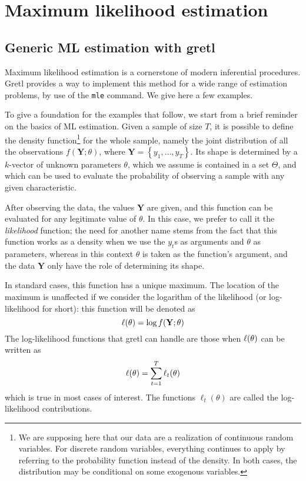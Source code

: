 \chapter{Maximum likelihood estimation}
\label{chap:mle}

\section{Generic ML estimation with gretl}

Maximum likelihood estimation is a cornerstone of modern inferential
procedures. Gretl provides a way to implement this method for a wide
range of estimation problems, by use of the \texttt{mle} command. We
give here a few examples.

To give a foundation for the examples that follow, we start from a
brief reminder on the basics of ML estimation.  Given a sample of size
$T$, it is possible to define the density function\footnote{We are
  supposing here that our data are a realization of continuous random
  variables. For discrete random variables, everything continues to
  apply by referring to the probability function instead of the
  density. In both cases, the distribution may be conditional on some
  exogenous variables.} for the whole sample, namely the joint
distribution of all the observations $f(\mathbf{Y} ; \theta)$, where
$\mathbf{Y} = \left\{ y_1, \ldots, y_T \right\}$.  Its shape is
determined by a $k$-vector of unknown parameters $\theta$, which we
assume is contained in a set $\Theta$, and which can be used to
evaluate the probability of observing a sample with any given
characteristic.

After observing the data, the values $\mathbf{Y}$ are given, and this
function can be evaluated for any legitimate value of $\theta$. In
this case, we prefer to call it the \emph{likelihood} function; the
need for another name stems from the fact that this function works as
a density when we use the $y_t$s as arguments and $\theta$ as
parameters, whereas in this context $\theta$ is taken as the
function's argument, and the data $\mathbf{Y}$ only have the role of
determining its shape.

In standard cases, this function has a unique maximum.  The location
of the maximum is unaffected if we consider the logarithm of the
likelihood (or log-likelihood for short): this function will be
denoted as
\[
  \ell(\theta) = \log  f(\mathbf{Y}; \theta)
\] 
The log-likelihood functions that gretl can handle are those when
$\ell(\theta)$ can be written as
\[
  \ell(\theta) = \sum_{t=1}^T \ell_t(\theta)
\] 
which is true in most cases of interest. The functions $\ell_t(\theta)$
are called the log-likelihood contributions.

